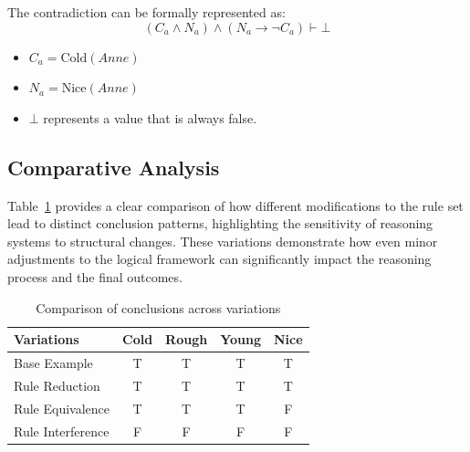 \documentclass{article}
\begin{document}
The contradiction can be formally represented as:
\[
(C_a \land N_a) \land (N_a \rightarrow \neg C_a) \vdash \bot
\]

\begin{itemize}
    \item $C_a = \mathrm{Cold}(Anne)$
    \item $N_a = \mathrm{Nice}(Anne)$
    \item $\bot$ represents a value that is always false.
\end{itemize}

\subsection{Comparative Analysis}

Table~\ref{comparison_conclusion} provides a clear comparison of how different modifications to the rule set lead to distinct conclusion patterns, highlighting the sensitivity of reasoning systems to structural changes. These variations demonstrate how even minor adjustments to the logical framework can significantly impact the reasoning process and the final outcomes.

\begin{table}
\centering
\begin{tabular}{|l|c|c|c|c|}
\hline
\textbf{Variations} & \textbf{Cold} & \textbf{Rough} & \textbf{Young} & \textbf{Nice} \\
\hline
Base Example & T & T & T & T \\
Rule Reduction & T & T & T & T \\
Rule Equivalence & T & T & T & F \\
Rule Interference & F & F & F & F \\
\hline
\end{tabular}
\caption{Comparison of conclusions across variations}
\label{comparison_conclusion}
\end{table}
\end{document}
